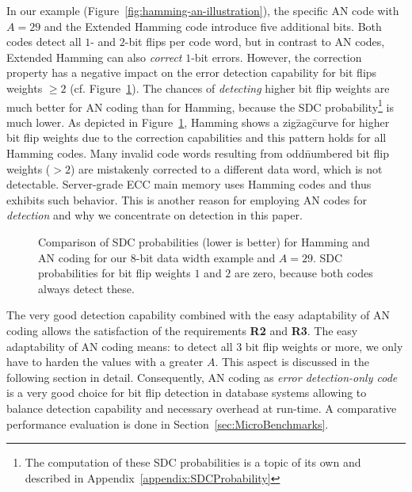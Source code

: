 In our example (Figure~\ref{fig:hamming-an-illustration}), the specific AN code with $A=29$ and the Extended Hamming code introduce five additional bits. Both codes detect all $1$- and $2$-bit flips per code word, but in contrast to AN codes, Extended Hamming can also \emph{correct} $1$-bit errors. However, the correction property has a negative impact on the error detection capability for bit flips weights $\geq 2$ (cf. Figure~\ref{fig:8bitSDCProbability}). The chances of \emph{detecting} higher bit flip weights are much better for AN coding than for Hamming, because the SDC probability\footnote{The computation of these SDC probabilities is a topic of its own and described in Appendix~\ref{appendix:SDCProbability}} is much lower. As depicted in Figure~\ref{fig:8bitSDCProbability}, Hamming shows a zig\=zag\=curve for higher bit flip weights due to the correction capabilities and this pattern holds for all Hamming codes. Many invalid code words resulting from odd\=numbered bit flip weights ($>2$) are mistakenly corrected to a different data word, which is not detectable. Server-grade ECC main memory uses Hamming codes and thus exhibits such behavior. This is another reason for employing AN codes for \emph{detection} and why we concentrate on detection in this paper.

\begin{figure}
	\centering
	{
		\scriptsize
		\graphicspath{{gnuplot/}}
		
	}
	\vspace{-0.4cm}
	\caption{Comparison of SDC probabilities (lower is better) for Hamming and AN coding for our 8-bit data width example and $A=29$. SDC probabilities for bit flip weights $1$ and $2$ are zero, because both codes always detect these.}
	\label{fig:8bitSDCProbability}
	\vspace{-0.4cm}
\end{figure}

The very good detection capability combined with the easy adaptability of AN coding allows the satisfaction of the requirements \textbf{R2} and \textbf{R3}. The easy adaptability of AN coding means: to detect all $3$ bit flip weights or more, we only have to harden the values with a greater \(A\). This aspect is discussed in the following section in detail. Consequently, AN coding as \emph{error detection-only code} is a very good choice for bit flip detection in database systems allowing to balance detection capability and necessary overhead at run-time. A comparative performance evaluation is done in Section~\ref{sec:MicroBenchmarks}.
